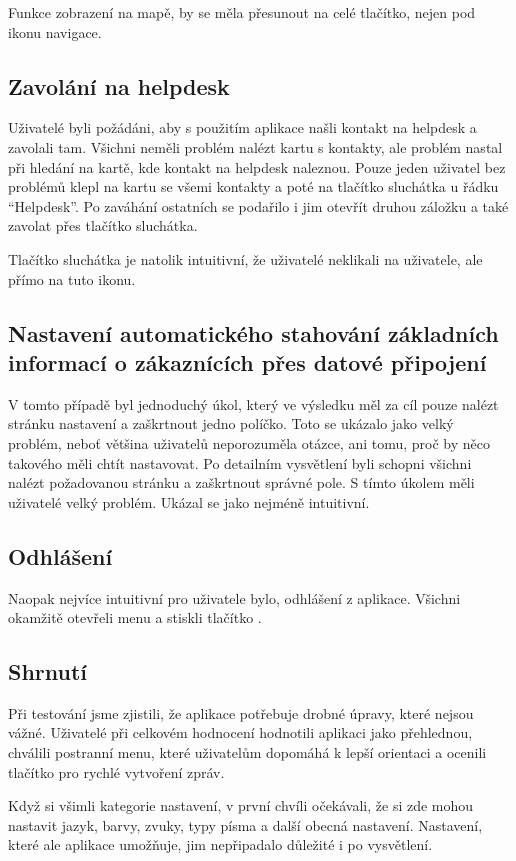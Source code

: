 \documentclass[11pt,twoside,a4paper]{book}
\begin{document}
Funkce zobrazení na mapě, by se měla přesunout na celé tlačítko, nejen pod ikonu navigace.

\subsection{Zavolání na helpdesk}
Uživatelé byli požádáni, aby s použitím aplikace našli kontakt na helpdesk a zavolali tam. Všichni neměli problém nalézt kartu s kontakty, ale problém nastal při hledání na kartě, kde kontakt na helpdesk naleznou. Pouze jeden uživatel bez problémů klepl na kartu se všemi kontakty a poté na tlačítko sluchátka u řádku “Helpdesk”. Po zaváhání ostatních se podařilo i jim otevřít druhou záložku a také zavolat přes tlačítko sluchátka. 

Tlačítko sluchátka je natolik intuitivní, že uživatelé neklikali na uživatele, ale přímo na tuto ikonu.

\subsection{Nastavení automatického stahování základních informací o zákaznících přes datové připojení}
V tomto případě byl jednoduchý úkol, který ve výsledku měl za cíl pouze nalézt stránku nastavení a zaškrtnout jedno políčko. Toto se ukázalo jako velký problém, neboť většina uživatelů neporozuměla otázce, ani tomu, proč by něco takového měli chtít nastavovat. Po detailním vysvětlení byli schopni všichni nalézt požadovanou stránku a zaškrtnout správné pole. S tímto úkolem měli uživatelé velký problém. Ukázal se jako nejméně intuitivní.

\subsection{Odhlášení}
Naopak nejvíce intuitivní pro uživatele bylo, odhlášení z aplikace. Všichni okamžitě otevřeli menu a stiskli tlačítko .

\subsection{Shrnutí}
Při testování jsme zjistili, že aplikace potřebuje drobné úpravy, které nejsou vážné. Uživatelé při celkovém hodnocení hodnotili aplikaci jako přehlednou, chválili postranní menu, které uživatelům dopomáhá k lepší orientaci a ocenili tlačítko pro rychlé vytvoření zpráv. 

Když si všimli kategorie nastavení, v první chvíli očekávali, že si zde mohou nastavit jazyk, barvy, zvuky, typy písma a další obecná nastavení. Nastavení, které ale aplikace umožňuje, jim nepřipadalo důležité i po vysvětlení.
\end{document}
